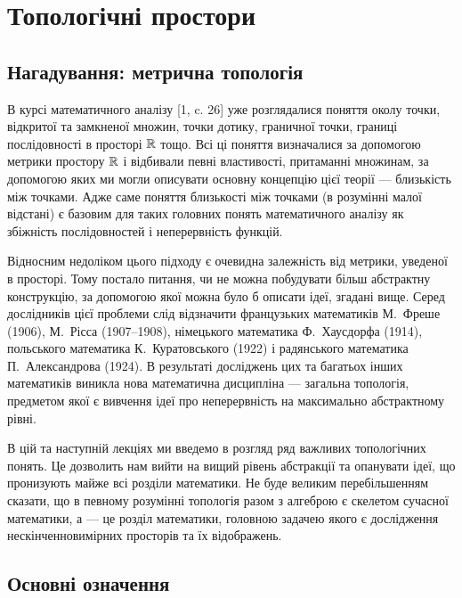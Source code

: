 \chapter{Топологічні простори}

\section{Нагадування: метрична топологія}

В курсі математичного аналізу [1, c. 26] уже розглядалися
поняття околу точки, відкритої та замкненої множин, точки
дотику, граничної точки, границі послідовності в просторі
$\mathbb{R}$ тощо. Всі ці поняття визначалися за допомогою метрики
простору $\mathbb{R}$ і відбивали певні властивості, притаманні
множинам, за допомогою яких ми могли описувати основну
концепцію цієї теорії --- близькість між точками. Адже саме
поняття близькості між точками (в розумінні малої відстані)
є базовим для таких головних понять математичного аналізу
як збіжність послідовностей і неперервність функцій.

Відносним недоліком цього підходу є очевидна
залежність від метрики, уведеної в просторі. Тому постало
питання, чи не можна побудувати більш абстрактну
конструкцію, за допомогою якої можна було б описати ідеї,
згадані вище. Серед дослідників цієї проблеми слід
відзначити французьких математиків М.~Фреше (1906),
М.~Рісса (1907--1908), німецького математика Ф.~Хаусдорфа
(1914), польського математика К.~Куратовського (1922) і
радянського математика П.~Александрова (1924). В
результаті досліджень цих та багатьох інших математиків
виникла нова математична дисципліна --- загальна
топологія, предметом якої є вивчення ідеї про неперервність
на максимально абстрактному рівні.

В цій та наступній лекціях ми введемо в розгляд ряд
важливих топологічних понять. Це дозволить нам вийти на
вищий рівень абстракції та опанувати ідеї, що
пронизують майже всі розділи математики. Не буде
великим перебільшенням сказати, що в певному розумінні
топологія разом з алгеброю є скелетом сучасної
математики, а  --- це розділ
математики, головною задачею якого є дослідження
нескінченновимірних просторів та їх відображень.

\section{Основні означення}

